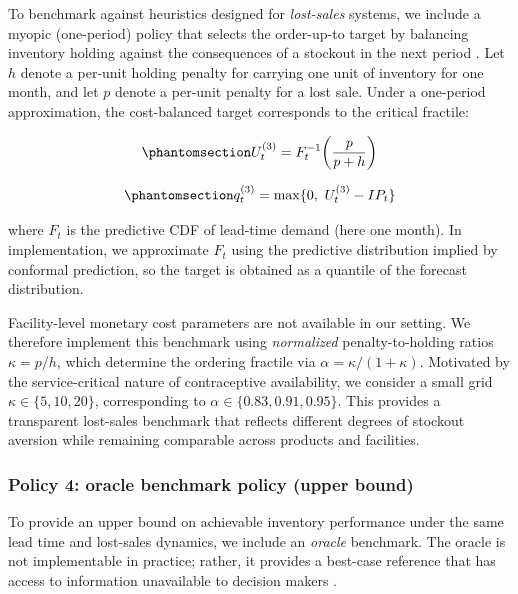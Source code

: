 \documentclass[
  authoryear,
  doubleblind,
  3p]{elsarticle}
\begin{document}
To benchmark against heuristics designed for \emph{lost-sales} systems,
we include a myopic (one-period) policy that selects the order-up-to
target by balancing inventory holding against the consequences of a
stockout in the next period \citep{bijvank2011, zipkin2008}. Let \(h\)
denote a per-unit holding penalty for carrying one unit of inventory for
one month, and let \(p\) denote a per-unit penalty for a lost sale.
Under a one-period approximation, the cost-balanced target corresponds
to the critical fractile:

\begin{equation}\phantomsection\label{eq-ut3}{
U_t^{(3)} = F_t^{-1}\!\left(\frac{p}{p+h}\right)
}\end{equation}

\begin{equation}\phantomsection\label{eq-qt3}{
q_t^{(3)} = \max\{0,\ U_t^{(3)} - IP_t\}
}\end{equation}

where \(F_t\) is the predictive CDF of lead-time demand (here one
month). In implementation, we approximate \(F_t\) using the predictive
distribution implied by conformal prediction, so the target is obtained
as a quantile of the forecast distribution.

Facility-level monetary cost parameters are not available in our
setting. We therefore implement this benchmark using \emph{normalized}
penalty-to-holding ratios \(\kappa = p/h\), which determine the ordering
fractile via \(\alpha = \kappa/(1+\kappa)\). Motivated by the
service-critical nature of contraceptive availability, we consider a
small grid \(\kappa \in \{5,10,20\}\), corresponding to
\(\alpha \in \{0.83, 0.91, 0.95\}\). This provides a transparent
lost-sales benchmark that reflects different degrees of stockout
aversion while remaining comparable across products and facilities.

\subsubsection{Policy 4: oracle benchmark policy (upper
bound)}\label{policy-4-oracle-benchmark-policy-upper-bound}

To provide an upper bound on achievable inventory performance under the
same lead time and lost-sales dynamics, we include an \emph{oracle}
benchmark. The oracle is not implementable in practice; rather, it
provides a best-case reference that has access to information
unavailable to decision makers \citep{sachs2014}.
\end{document}
